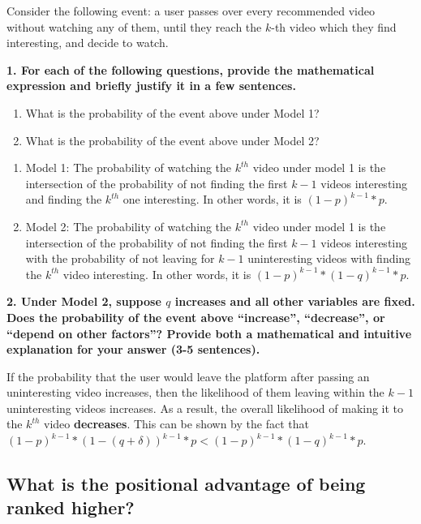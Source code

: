 \documentclass{article}
\begin{document}
Consider the following event: a user passes over every recommended video without watching any of them, until they reach the $k$-th video which they find interesting, and decide to watch.

\textbf{1. For each of the following questions, provide the mathematical expression and briefly justify it in a few sentences.}
\begin{enumerate}[label=\Alph*.]
    \item What is the probability of the event above under Model 1?
    \item What is the probability of the event above under Model 2?
\end{enumerate}

\bigskip
\begin{mdframed}
\begin{enumerate}[label=\Alph*.]
    \item Model 1: The probability of watching the $k^{th}$ video under model 1 is the intersection of the probability of not finding the first $k-1$ videos interesting and finding the $k^{th}$ one interesting. In other words, it is $(1-p)^{k-1}*p$.
    \item Model 2: The probability of watching the $k^{th}$ video under model 1 is the intersection of the probability of not finding the first $k-1$ videos interesting with the probability of not leaving for $k-1$ uninteresting videos with finding the $k^{th}$ video interesting. In other words, it is $(1-p)^{k-1}*(1-q)^{k-1}*p$.
\end{enumerate}
\end{mdframed}
\bigskip


\textbf{2. Under Model 2, suppose $q$ increases and all other variables are fixed. Does the probability of the event above ``increase'', ``decrease'', or ``depend on other factors''? Provide both a mathematical and intuitive explanation for your answer (3-5 sentences).}

\bigskip
\begin{mdframed}
If the probability that the user would leave the platform after passing an uninteresting video increases, then the likelihood of them leaving within the $k-1$ uninteresting videos increases. As a result, the overall likelihood of making it to the $k^{th}$ video \textbf{decreases}. This can be shown by the fact that $(1-p)^{k-1}*(1-(q+\delta))^{k-1}*p < (1-p)^{k-1}*(1-q)^{k-1}*p$.
\end{mdframed}
\bigskip

\subsection*{What is the positional advantage of being ranked higher?}
\end{document}
